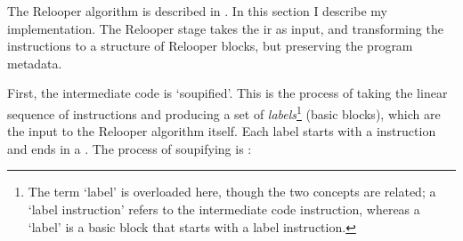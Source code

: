 \documentclass[00-main.tex]{subfiles}
\begin{document}
The Relooper algorithm is described in . In this section I describe my implementation.
The Relooper stage takes the \gls{ir} as input, and transforming the instructions to a structure of Relooper blocks, but preserving the program metadata.

First, the intermediate code is `soupified'.
This is the process of taking the linear sequence of instructions and producing a set of \emph{labels}\footnote{The term `label' is overloaded here, though the two concepts are related; a `label instruction' refers to the intermediate code instruction, whereas a `label' is a basic block that starts with a label instruction.} (basic blocks), which are the input to the Relooper algorithm itself.
Each label starts with a  instruction and ends in a .
The process of soupifying is :
\end{document}
